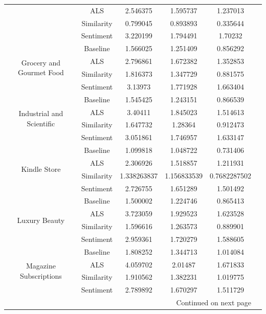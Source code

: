 \documentclass[sigconf,authorversion,nonacm]{acmart}
\begin{document}
\begin{table}
\begin{tabular}{cccccc}
         & ALS & 2.546375 & 1.595737 & 1.237013 \\
         & Similarity & 0.799045 & 0.893893 & 0.335644 \\
         & Sentiment\footnote[1] & 3.220199 & 1.794491 & 1.70232 \\ \midrule
        \multirow{4}{*}{Grocery and Gourmet Food} & Baseline & 1.566025 & 1.251409 & 0.856292 \\
         & ALS & 2.796861 & 1.672382 & 1.352853 \\
         & Similarity & 1.816373 & 1.347729 & 0.881575 \\
         & Sentiment \footnote[1]& 3.13973 & 1.771928 & 1.663404 \\ \midrule
        \multirow{4}{*}{Industrial and Scientific} & Baseline & 1.545425 & 1.243151 & 0.866539 \\
         & ALS & 3.40411 & 1.845023 & 1.514613 \\
         & Similarity & 1.647732 & 1.28364 & 0.912473 \\
         & Sentiment\footnote[1] & 3.051861 & 1.746957 & 1.633147 \\ \midrule
        \multirow{4}{*}{Kindle Store} & Baseline & 1.099818 & 1.048722 & 0.731406 \\
         & ALS & 2.306926 & 1.518857 & 1.211931 \\
         & Similarity & 1.338263837 & 1.156833539 & 0.7682287502 \\
         & Sentiment\footnote[1] & 2.726755 & 1.651289 & 1.501492 \\ \midrule
        \multirow{4}{*}{Luxury Beauty} & Baseline & 1.500002 & 1.224746 & 0.865413 \\
         & ALS & 3.723059 & 1.929523 & 1.623528 \\
         & Similarity & 1.596616 & 1.263573 & 0.889901 \\
         & Sentiment\footnote[1] & 2.959361 & 1.720279 & 1.588605 \\ \midrule
        \multirow{4}{*}{Magazine Subscriptions} & Baseline & 1.808252 & 1.344713 & 1.014084 \\
         & ALS & 4.059702 & 2.01487 & 1.671833 \\
         & Similarity & 1.910562 & 1.382231 & 1.019775 \\
         & Sentiment & 2.789892 & 1.670297 & 1.511729 \\ \midrule
         \multicolumn{5}{r}{Continued on next page} \\ \bottomrule

        \end{tabular}
    \end{table}
\end{document}
